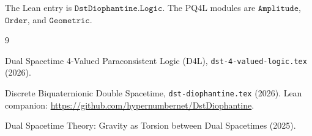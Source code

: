 \documentclass[dvipdfmx,11pt,a4paper]{article}
\theoremstyle{definition}
\theoremstyle{remark}
\begin{document}
The Lean entry is \(\texttt{DstDiophantine.Logic}\). The PQ4L modules
are \(\texttt{Amplitude}\), \(\texttt{Order}\), and \(\texttt{Geometric}\).

\begin{thebibliography}{9}
\raggedright

Dual Spacetime 4-Valued Paraconsistent Logic (D4L),
\texttt{dst-4-valued-logic.tex} (2026).

Discrete Biquaternionic Double Spacetime,
\texttt{dst-diophantine.tex} (2026). Lean companion:
\url{https://github.com/hypernumbernet/DstDiophantine}.

Dual Spacetime Theory: Gravity as Torsion between Dual Spacetimes (2025).

\end{thebibliography}
\end{document}
